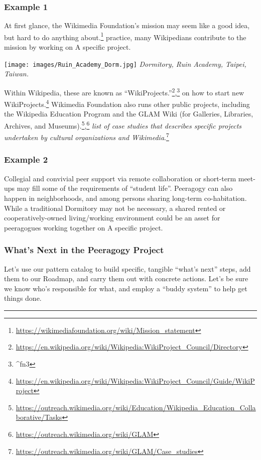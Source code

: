 \hypertarget{example-1}{%
\subsubsection{Example 1}\label{example-1}}

At first glance, the Wikimedia Foundation's mission may seem like a good
idea, but hard to do anything about.\footnote{\url{https://wikimediafoundation.org/wiki/Mission_statement}}
practice, many Wikipedians contribute to the mission by working on {{A
specific project}}.

\texttt{[image: images/Ruin\_Academy\_Dorm.jpg]} \emph{Dormitory, Ruin
Academy, Taipei, Taiwan.}

Within Wikipedia, these are known as
``WikiProjects.''\footnote{\url{https://en.wikipedia.org/wiki/Wikipedia:WikiProject_Council/Directory}},\footnote{\^{}fn3}
on how to start new WikiProjects.\footnote{\url{https://en.wikipedia.org/wiki/Wikipedia:WikiProject_Council/Guide/WikiProject}}
Wikimedia Foundation also runs other public projects, including the
Wikipedia Education Program and the GLAM Wiki (for Galleries, Libraries,
Archives, and Museums).\footnote{\url{https://outreach.wikimedia.org/wiki/Education/Wikipedia_Education_Collaborative/Tasks}},\footnote{\url{https://outreach.wikimedia.org/wiki/GLAM}}
\emph{list of case studies that describes specific projects undertaken
by cultural organizations and Wikimedia}.\footnote{\url{https://outreach.wikimedia.org/wiki/GLAM/Case_studies}}

\hypertarget{example-2}{%
\subsubsection{Example 2}\label{example-2}}

Collegial and convivial peer support via remote collaboration or
short-term meet-ups may fill some of the requirements of ``student
life''. Peeragogy can also happen in neighborhoods, and among persons
sharing long-term co-habitation. While a traditional Dormitory may not
be necessary, a shared rented or cooperatively-owned living/working
environment could be an asset for peeragogues working together on {{A
specific project}}.

\hypertarget{whats-next-in-the-peeragogy-project}{%
\subsubsection{What's Next in the Peeragogy
Project}\label{whats-next-in-the-peeragogy-project}}

Let's use our pattern catalog to build specific, tangible ``what's
next'' steps, add them to our {{Roadmap}}, and carry them out with
concrete actions. Let's be sure we know who's responsible for what, and
employ a ``buddy system'' to help get things done.

\begin{center}\rule{0.5\linewidth}{0.5pt}\end{center}
